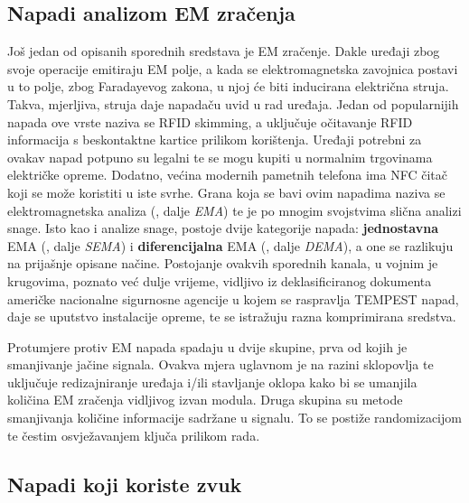 \documentclass[times, utf8, diplomski]{fer}
\begin{document}
\subsection{Napadi analizom EM zračenja}
Još jedan od opisanih sporednih sredstava je EM zračenje. Dakle uređaji zbog svoje operacije emitiraju EM polje, a kada se elektromagnetska zavojnica postavi u to polje, zbog Faradayevog zakona, u njoj će biti inducirana električna struja. Takva, mjerljiva, struja daje napadaču uvid u rad uređaja. Jedan od popularnijih napada ove vrste naziva se RFID skimming, a uključuje očitavanje RFID informacija s beskontaktne kartice prilikom korištenja. Uređaji potrebni za ovakav napad potpuno su legalni te se mogu kupiti u normalnim trgovinama električke opreme. Dodatno, većina modernih pametnih telefona ima NFC čitač koji se može koristiti u iste svrhe. Grana koja se bavi ovim napadima naziva se elektromagnetska analiza (, dalje \emph{EMA}) te je po mnogim svojstvima slična analizi snage. Isto kao i analize snage, postoje dvije kategorije napada: \textbf{jednostavna} EMA (, dalje \emph{SEMA}) i \textbf{diferencijalna} EMA (, dalje \emph{DEMA}), a one se razlikuju na prijašnje opisane načine. Postojanje ovakvih sporednih kanala, u vojnim je krugovima, poznato već dulje vrijeme, vidljivo iz deklasificiranog dokumenta \citep{mcconnell1992national} američke nacionalne sigurnosne agencije  u kojem se raspravlja TEMPEST napad, daje se uputstvo instalacije opreme, te se istražuju razna komprimirana sredstva.

Protumjere protiv EM napada spadaju u dvije skupine, prva od kojih je smanjivanje jačine signala. Ovakva mjera uglavnom je na razini sklopovlja te uključuje redizajniranje uređaja i/ili stavljanje oklopa kako bi se umanjila količina EM zračenja vidljivog izvan modula. Druga skupina su metode smanjivanja količine informacije sadržane u signalu. To se postiže randomizacijom te čestim osvježavanjem ključa prilikom rada.

\subsection{Napadi koji koriste zvuk}
\end{document}
